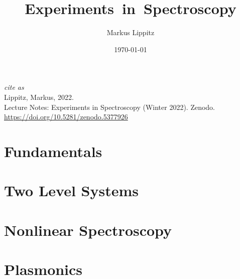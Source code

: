 \documentclass[notoc,nofonts,a4paper,twoside,nobib]{tufte-book}
\begin{document}
\sloppy
\tikzexternaldisable


\title{\hbox{Experiments in Spectroscopy}}

\author{Markus Lippitz}
\date{\today}


\maketitle

\newpage
\thispagestyle{empty}

\hfill

\vfill

\noindent \textit{cite as}\\
\noindent Lippitz, Markus, 2022.  \\
\noindent Lecture Notes: Experiments in Spectroscopy (Winter 2022). Zenodo. \\
\noindent \url{https://doi.org/10.5281/zenodo.5377926}

%
\tableofcontents



%
\part{Fundamentals}







\part{Two Level Systems}






\part{Nonlinear Spectroscopy}






\part{Plasmonics}
\end{document}
